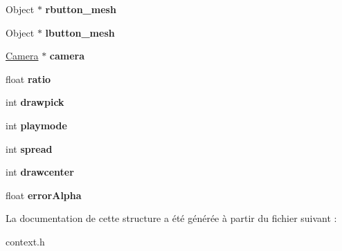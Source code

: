 \begin{DoxyCompactItemize}
\item 
\hypertarget{structcontext_af7e37612f79e68a4d7923e9311da5dee}{Object $\ast$ {\bfseries rbutton\-\_\-mesh}}\label{structcontext_af7e37612f79e68a4d7923e9311da5dee}

\item 
\hypertarget{structcontext_a7ac18da34f54e718f30e08252bf86be1}{Object $\ast$ {\bfseries lbutton\-\_\-mesh}}\label{structcontext_a7ac18da34f54e718f30e08252bf86be1}

\item 
\hypertarget{structcontext_af95833c961e5bd20dcd54e1d46a03c0b}{\hyperlink{structcamera}{Camera} $\ast$ {\bfseries camera}}\label{structcontext_af95833c961e5bd20dcd54e1d46a03c0b}

\item 
\hypertarget{structcontext_a207ad05f99cc72068a92358861ff5e71}{float {\bfseries ratio}}\label{structcontext_a207ad05f99cc72068a92358861ff5e71}

\item 
\hypertarget{structcontext_a3d99a9e2fdae8652db4aa612f8d9cd96}{int {\bfseries drawpick}}\label{structcontext_a3d99a9e2fdae8652db4aa612f8d9cd96}

\item 
\hypertarget{structcontext_aa49a4684df5eedf20a5c1589e381b00e}{int {\bfseries playmode}}\label{structcontext_aa49a4684df5eedf20a5c1589e381b00e}

\item 
\hypertarget{structcontext_a9fcb2da8648b09e9271722def1ad799a}{int {\bfseries spread}}\label{structcontext_a9fcb2da8648b09e9271722def1ad799a}

\item 
\hypertarget{structcontext_a8d7f4c9045fb7c63976525d5d9af55db}{int {\bfseries drawcenter}}\label{structcontext_a8d7f4c9045fb7c63976525d5d9af55db}

\item 
\hypertarget{structcontext_a7b00bfb3a7e69c510dd27c1872cbacd3}{float {\bfseries error\-Alpha}}\label{structcontext_a7b00bfb3a7e69c510dd27c1872cbacd3}

\end{DoxyCompactItemize}


La documentation de cette structure a été générée à partir du fichier suivant \-:\begin{DoxyCompactItemize}
\item 
context.\-h\end{DoxyCompactItemize}
